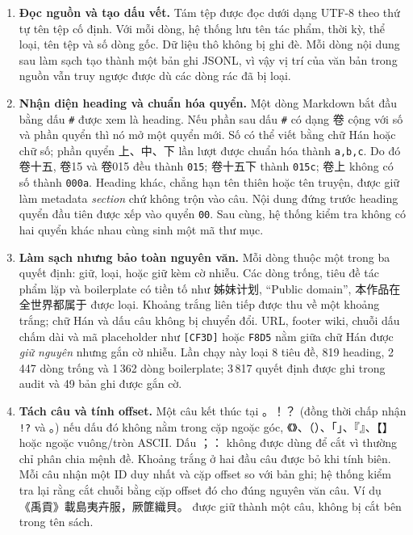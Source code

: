 \documentclass[11pt,a4paper]{article}
\newcommand{\han}[1]{{\hanfont #1}}
\begin{document}
\begin{enumerate}
  \item \textbf{Đọc nguồn và tạo dấu vết.} Tám tệp được đọc dưới dạng UTF-8 theo
  thứ tự tên tệp cố định. Với mỗi dòng, hệ thống lưu tên tác phẩm, thời kỳ, thể
  loại, tên tệp và số dòng gốc. Dữ liệu thô không bị ghi đè. Mỗi dòng nội dung
  sau làm sạch tạo thành một bản ghi JSONL, vì vậy vị trí của văn bản trong
  nguồn vẫn truy ngược được dù các dòng rác đã bị loại.

  \item \textbf{Nhận diện heading và chuẩn hóa quyển.} Một dòng Markdown bắt đầu
  bằng dấu \texttt{\#} được xem là heading. Nếu phần sau dấu \texttt{\#} có dạng
  \han{卷} cộng với số và phần quyển thì nó mở một quyển mới. Số có thể viết bằng
  chữ Hán hoặc chữ số; phần quyển \han{上、中、下} lần lượt được chuẩn hóa thành
  \texttt{a,b,c}. Do đó \han{卷十五}, \han{卷}15 và \han{卷}015 đều thành
  \texttt{015}; \han{卷十五下} thành \texttt{015c}; \han{卷上} không có số thành
  \texttt{000a}. Heading khác, chẳng hạn tên thiên hoặc tên truyện, được giữ làm
  metadata \emph{section} chứ không trộn vào câu. Nội dung đứng trước heading
  quyển đầu tiên được xếp vào quyển \texttt{00}. Sau cùng, hệ thống kiểm tra
  không có hai quyển khác nhau cùng sinh một mã thư mục.

  \item \textbf{Làm sạch nhưng bảo toàn nguyên văn.} Mỗi dòng thuộc một trong
  ba quyết định: giữ, loại, hoặc giữ kèm cờ nhiễu. Các dòng trống, tiêu đề tác
  phẩm lặp và boilerplate có tiền tố như \han{姊妹计划}, ``Public domain'',
  \han{本作品在全世界都属于} được loại. Khoảng trắng liên tiếp được thu về một
  khoảng trắng; chữ Hán và dấu câu không bị chuyển đổi. URL, footer wiki, chuỗi
  dấu chấm dài và mã placeholder như \texttt{[CF3D]} hoặc \texttt{F8D5} nằm giữa chữ
  Hán được \emph{giữ nguyên} nhưng gắn cờ nhiễu. Lần chạy này loại 8 tiêu đề,
  819 heading, 2\,447 dòng trống và 1\,362 dòng boilerplate; 3\,817 quyết định
  được ghi trong audit và 49 bản ghi được gắn cờ.

  \item \textbf{Tách câu và tính offset.} Một câu kết thúc tại
  \han{。！？} (đồng thời chấp nhận \texttt{!?} và \han{｡}) nếu dấu đó không nằm
  trong cặp ngoặc góc, \han{《》、（）、「」、『』、【】} hoặc ngoặc vuông/tròn ASCII.
  Dấu \han{；：} không được dùng để cắt vì thường chỉ phân chia mệnh đề. Khoảng
  trắng ở hai đầu câu được bỏ khi tính biên. Mỗi câu nhận một ID duy nhất và
  cặp offset so với bản ghi; hệ thống kiểm tra lại rằng cắt chuỗi bằng cặp
  offset đó cho đúng nguyên văn câu. Ví dụ
  \han{《禹貢》載島夷卉服，厥篚織貝。} được giữ thành một câu, không bị cắt bên
  trong tên sách.


\end{enumerate}
\end{document}
